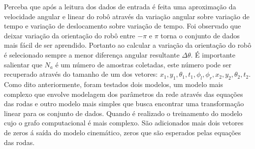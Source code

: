Perceba que após a leitura dos dados de entrada é feita uma aproximação da
velocidade angular e linear do robô através da variação angular sobre variação de tempo e
variação de deslocamento sobre variação de tempo.
Foi observado que deixar variação da orientação do robô entre
$-\pi$ e $\pi$ torna o conjunto de dados mais fácil de ser aprendido.
Portanto ao calcular a variação da orientação do robô é selecionado
sempre a menor diferença angular resultante $\Delta \theta$.  
É importante salientar que $N_a$
é um número de amostras coletadas, este número pode ser recuperado através
do tamanho de um dos vetores: $x_1,y_1,\theta_{1},t_1,\phi_l,\phi_r,x_2,y_2,\theta_{2},t_2$.
Como dito anteriormente, foram testados dois modelos, um modelo mais complexo
que envolve modelagem dos parâmetros da rede através das equações das rodas
e outro modelo mais simples que busca encontrar uma transformação linear
para os conjunto de dados. Quando é realizado o treinamento do modelo
cujo o grafo computacional é mais complexo.
São adicionados mais dois vetores de zeros á saída do modelo cinemático, zeros
que são esperados pelas equações das rodas. 